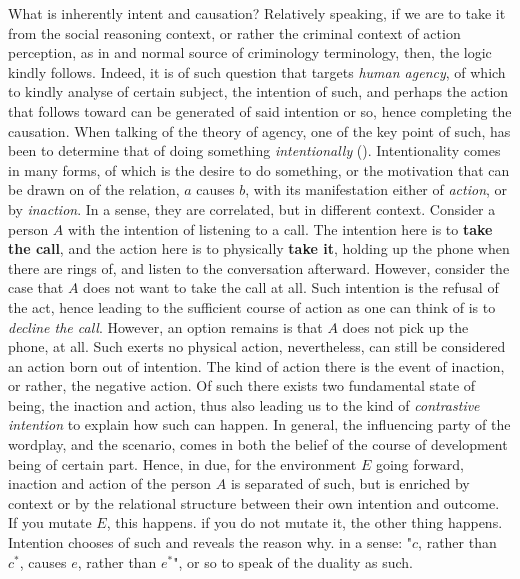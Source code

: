 What is inherently intent and causation? Relatively speaking, if we are to take it from the social reasoning context, or rather the criminal context of action perception, as in \cite{GoodmanBakerTenenbaum2009} and normal source of criminology terminology, then, the logic kindly follows. Indeed, it is of such question that targets \textit{human agency}, of which to kindly analyse of certain subject, the intention of such, and perhaps the action that follows toward can be generated of said intention or so, hence completing the causation. When talking of the theory of agency, one of the key point of such, has been to determine that of doing something \textit{intentionally} (\cite{Hornsby2004}). Intentionality comes in many forms, of which is the desire to do something, or the motivation that can be drawn on of the relation, $a$ causes $b$, with its manifestation either of \textit{action}, or by \textit{inaction}. In a sense, they are correlated, but in different context. Consider a person $A$ with the intention of listening to a call. The intention here is to \textbf{take the call}, and the action here is to physically \textbf{take it}, holding up the phone when there are rings of, and listen to the conversation afterward. However, consider the case that $A$ does not want to take the call at all. Such intention is the refusal of the act, hence leading to the sufficient course of action as one can think of is to \textit{decline the call}. However, an option remains is that $A$ does not pick up the phone, at all. Such exerts no physical action, nevertheless, can still be considered an action born out of intention. The kind of action there is the event of inaction, or rather, the negative action. Of such there exists two fundamental state of being, the inaction and action, thus also leading us to the kind of \textit{contrastive intention} to explain how such can happen. In general, the influencing party of the wordplay, and the scenario, comes in both the belief of the course of development being of certain part. Hence, in due, for the environment $E$ going forward, inaction and action of the person $A$ is separated of such, but is enriched by context or by the relational structure between their own intention and outcome. If you mutate $E$, this happens. if you do not mutate it, the other thing happens. Intention chooses of such and reveals the reason why. in a sense: "$c$, rather than $c^{*}$, causes $e$, rather than $e^{*}$", or so to speak of the duality as such.  

